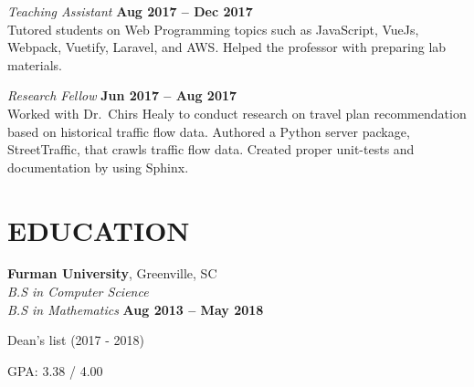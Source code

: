 \documentclass[margin,line]{resume}
\begin{document}
\begin{resume}
    \textsl{Teaching Assistant} \vspace{2mm}\hfill \textbf{Aug 2017 -- Dec 2017}\\
    Tutored students on Web Programming topics such as JavaScript, VueJs, Webpack, Vuetify, Laravel, and
    AWS. Helped the professor with preparing lab materials. \vspace{1mm}
    
    \textsl{Research Fellow} \vspace{2mm}\hfill \textbf{Jun 2017 -- Aug 2017}\\
    Worked with Dr.~Chirs Healy to conduct research on travel plan recommendation based on historical traffic flow data. Authored a Python server package, StreetTraffic, that crawls traffic flow data. Created proper unit-tests and documentation by using Sphinx.




\sectionline

    \section{\mysidestyle \textbf{\large{E}\small{DUCATION}}}

    \textbf{\listing Furman University}, Greenville, SC \vspace{2mm}\\\vspace{1mm}%
    \textsl{B.S in Computer Science \\ B.S in Mathematics} \hfill \vspace{0.1cm} \textbf{ Aug 2013 -- May 2018}\vspace{-3mm}\\\vspace{-1mm}%
    \begin{list2}
        \item Dean's list (2017 - 2018)
        \item GPA: 3.38 / 4.00
    \end{list2}
    





\end{resume}
\end{document}
